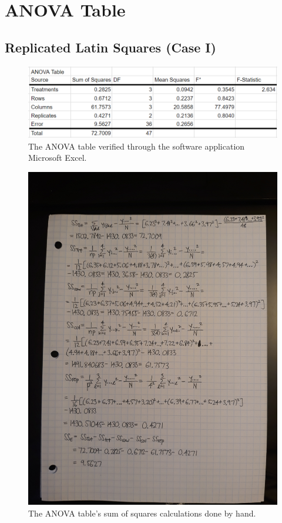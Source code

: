 

%
\chapter*{\thechapter \quad ANOVA Table}
\label{appendixA}

\section{Replicated Latin Squares (Case I)}
\begin{figure}[htp]
    \centering
    \includegraphics[width=150mm]{true_anova_stat530.png}
    \caption{The ANOVA table verified through the software application Microsoft Excel.}
    \label{fig:ANOVA}
\end{figure}

\begin{figure}[htp]
    \centering
    \includegraphics[width=150mm, angle=270]{handwork.jpg}
    \caption{The ANOVA table's sum of squares calculations done by hand.}
    \label{fig:ANOVA}
\end{figure}